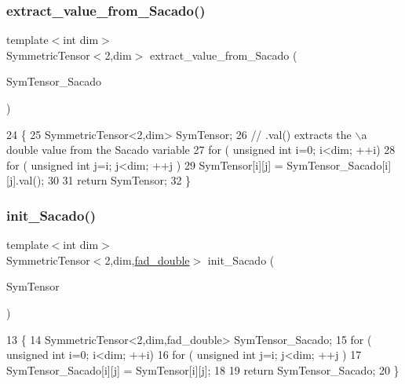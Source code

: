 \subsubsection{\texorpdfstring{extract\+\_\+value\+\_\+from\+\_\+\+Sacado()}{extract\_value\_from\_Sacado()}}
{\footnotesize\ttfamily template$<$int dim$>$ \\
Symmetric\+Tensor$<$2,dim$>$ extract\+\_\+value\+\_\+from\+\_\+\+Sacado (\begin{DoxyParamCaption}\item[{const Symmetric\+Tensor$<$ 2, dim, \hyperlink{Sacado-auxiliary__functions_8h_a868b94676739e612d9c95940e70892a9}{fad\+\_\+double} $>$ \&}]{Sym\+Tensor\+\_\+\+Sacado }\end{DoxyParamCaption})}


\begin{DoxyCode}
24 \{
25     SymmetricTensor<2,dim> SymTensor;
26     \textcolor{comment}{// .val() extracts the \(\backslash\)a double value from the Sacado variable}
27      \textcolor{keywordflow}{for} ( \textcolor{keywordtype}{unsigned} \textcolor{keywordtype}{int} i=0; i<dim; ++i)
28         \textcolor{keywordflow}{for} ( \textcolor{keywordtype}{unsigned} \textcolor{keywordtype}{int} j=i; j<dim; ++j )
29             SymTensor[i][j] = SymTensor\_Sacado[i][j].val();
30      
31      \textcolor{keywordflow}{return} SymTensor;
32 \}
\end{DoxyCode}
\mbox{\label{Sacado-auxiliary__functions_8h_a05eaab6eac85b896a69c4fc2984628bc}} 
\subsubsection{\texorpdfstring{init\+\_\+\+Sacado()}{init\_Sacado()}}
{\footnotesize\ttfamily template$<$int dim$>$ \\
Symmetric\+Tensor$<$2,dim,\hyperlink{Sacado-auxiliary__functions_8h_a868b94676739e612d9c95940e70892a9}{fad\+\_\+double}$>$ init\+\_\+\+Sacado (\begin{DoxyParamCaption}\item[{const Symmetric\+Tensor$<$ 2, dim, double $>$ \&}]{Sym\+Tensor }\end{DoxyParamCaption})}


\begin{DoxyCode}
13 \{
14     SymmetricTensor<2,dim,fad\_double> SymTensor\_Sacado;
15      \textcolor{keywordflow}{for} ( \textcolor{keywordtype}{unsigned} \textcolor{keywordtype}{int} i=0; i<dim; ++i)
16         \textcolor{keywordflow}{for} ( \textcolor{keywordtype}{unsigned} \textcolor{keywordtype}{int} j=i; j<dim; ++j )
17             SymTensor\_Sacado[i][j] = SymTensor[i][j];
18      
19      \textcolor{keywordflow}{return} SymTensor\_Sacado;
20 \}
\end{DoxyCode}
